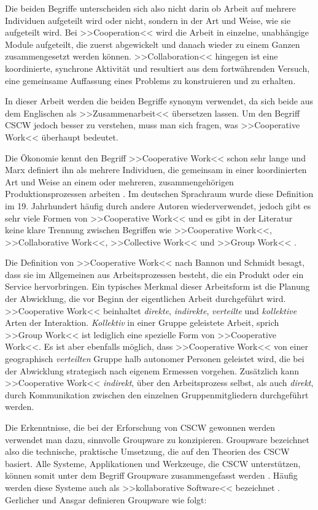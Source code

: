 	\medskip Die beiden Begriffe unterscheiden sich also nicht darin ob Arbeit auf mehrere Individuen aufgeteilt wird oder nicht, sondern in der Art und Weise, wie sie aufgeteilt wird. Bei >>Cooperation<< wird die Arbeit in einzelne, unabhängige Module aufgeteilt, die zuerst abgewickelt und danach wieder zu einem Ganzen zusammengesetzt werden können. >>Collaboration<< hingegen ist eine koordinierte, synchrone Aktivität und resultiert aus dem fortwährenden Versuch, eine gemeinsame Auffassung eines Problems zu konstruieren und zu erhalten.
	
	In dieser Arbeit werden die beiden Begriffe synonym verwendet, da sich beide aus dem Englischen als >>Zusammenarbeit<< übersetzen lassen. Um den Begriff CSCW jedoch besser zu verstehen, muss man sich fragen, was >>Cooperative Work<< überhaupt bedeutet.
	
	Die Ökonomie kennt den Begriff >>Cooperative Work<< schon sehr lange und Marx definiert ihn als mehrere Individuen, die gemeinsam in einer koordinierten Art und Weise an einem oder mehreren, zusammengehörigen Produktionsprozessen arbeiten \citep{Marx:1867}. Im deutschen Sprachraum wurde diese Definition im 19. Jahrhundert häufig durch andere Autoren wiederverwendet, jedoch gibt es sehr viele Formen von >>Cooperative Work<< und es gibt in der Literatur keine klare Trennung zwischen Begriffen wie >>Cooperative Work<<, >>Collaborative Work<<, >>Collective Work<< und >>Group Work<< \citep{Bannon:1990p244}.
	
	Die Definition von >>Cooperative Work<< nach Bannon und Schmidt besagt, dass sie im Allgemeinen aus Arbeitsprozessen besteht, die ein Produkt oder ein Service hervorbringen. Ein typisches Merkmal dieser Arbeitsform ist die Planung der Abwicklung, die vor Beginn der eigentlichen Arbeit durchgeführt wird. >>Cooperative Work<< beinhaltet \emph{direkte}, \emph{indirekte}, \emph{verteilte} und \emph{kollektive} Arten der Interaktion. \emph{Kollektiv} in einer Gruppe geleistete Arbeit, sprich >>Group Work<< ist lediglich eine spezielle Form von >>Cooperative Work<<. Es ist aber ebenfalls möglich, dass >>Cooperative Work<< von einer geographisch \emph{verteilten} Gruppe halb autonomer Personen geleistet wird, die bei der Abwicklung strategisch nach eigenem Ermessen vorgehen. Zusätzlich kann >>Cooperative Work<< \emph{indirekt}, über den Arbeitsprozess selbst, als auch \emph{direkt}, durch Kommunikation zwischen den einzelnen Gruppenmitgliedern durchgeführt werden. \citep{Bannon:1990p244}
	
	\bigskip Die Erkenntnisse, die bei der Erforschung von CSCW gewonnen werden verwendet man dazu, sinnvolle Groupware zu konzipieren. Groupware bezeichnet also die technische, praktische Umsetzung, die auf den Theorien des CSCW basiert. Alle Systeme, Applikationen und Werkzeuge, die CSCW unterstützen, können somit unter dem Begriff Groupware zusammengefasst werden \citep{Koch2008, Gerlicher:2007p241}. Häufig werden diese Systeme auch als >>kollaborative Software<< bezeichnet \citep{Bannon:1990p244}. Gerlicher und Ansgar definieren Groupware wie folgt:
	
